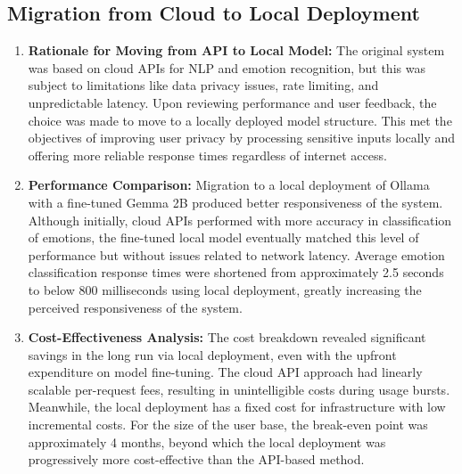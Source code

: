 \documentclass[conference]{IEEEtran}
\begin{document}
\subsection{Migration from Cloud to Local Deployment}
\begin{enumerate}
    \item \textbf{Rationale for Moving from API to Local Model:} The original system was based on cloud APIs for NLP and emotion recognition, but this was subject to limitations like data privacy issues, rate limiting, and unpredictable latency. Upon reviewing performance and user feedback, the choice was made to move to a locally deployed model structure. This met the objectives of improving user privacy by processing sensitive inputs locally and offering more reliable response times regardless of internet access.
    \item \textbf{Performance Comparison:} Migration to a local deployment of Ollama with a fine-tuned Gemma 2B produced better responsiveness of the system. Although initially, cloud APIs performed with more accuracy in classification of emotions, the fine-tuned local model eventually matched this level of performance but without issues related to network latency. Average emotion classification response times were shortened from approximately 2.5 seconds to below 800 milliseconds using local deployment, greatly increasing the perceived responsiveness of the system.
    \item \textbf{Cost-Effectiveness Analysis:} The cost breakdown revealed significant savings in the long run via local deployment, even with the upfront expenditure on model fine-tuning. The cloud API approach had linearly scalable per-request fees, resulting in unintelligible costs during usage bursts. Meanwhile, the local deployment has a fixed cost for infrastructure with low incremental costs. For the size of the user base, the break-even point was approximately 4 months, beyond which the local deployment was progressively more cost-effective than the API-based method.
\end{enumerate}
\end{document}
